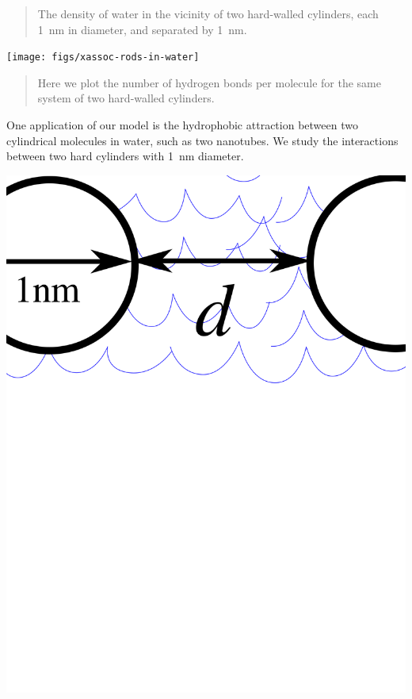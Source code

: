 \documentclass[landscape,a0paper,final,showframe]{baposter}
\begin{document}
\begin{poster}
{\begin{multicols}{2}
      \vspace{-1em}
      \begin{quote}
        The density of water in the vicinity of two hard-walled
        cylinders, each 1~nm in diameter, and separated by 1~nm.
      \end{quote}

      \texttt{[image: figs/xassoc-rods-in-water]}

      \vspace{-1em}
      \begin{quote}
      Here we plot the number of hydrogen bonds per molecule for the
      same system of two hard-walled cylinders.
      \end{quote}
    \end{multicols}
    
    \begin{multicols}{2}
      One application of our model is the hydrophobic attraction
      between two cylindrical molecules in water, such as two
      nanotubes.  We study the interactions between two hard cylinders
      with 1~nm diameter.
      \begin{center}
        \includegraphics[width=0.95\columnwidth]{figs/two-rods-diagram}

\end{center}
\end{multicols}}
\end{poster}
\end{document}
